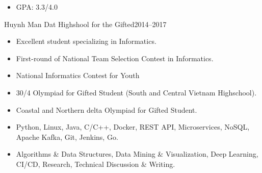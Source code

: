 
\begin{itemize}
	\item GPA: 3.3/4.0
\end{itemize}
\smallskip

{Huynh Man Dat Highshool for the Gifted}{2014--2017}{}
\begin{itemize}
	\item Excellent student specializing in Informatics.
\end{itemize}


\begin{itemize}
	\item	{First-round of National Team Selection Contest in Informatics.} 
\end{itemize}


\begin{itemize}
	\item	{National Informatics Contest for Youth} 
\end{itemize}


\begin{itemize}
	\item{30/4 Olympiad for Gifted Student (South and Central Vietnam Highschool)}. 
\end{itemize}

\begin{itemize}
	\item{Coastal and Northern delta Olympiad for Gifted Student}. 
\end{itemize}


\begin{itemize}
	\item{Python, Linux, Java, C/C++, Docker, REST API, Microservices, NoSQL, Apache Kafka, Git, Jenkins, Go.}
	\item Algorithms \& Data Structures, Data Mining \& Visualization, Deep Learning, CI/CD, Research, Technical Discussion \& Writing.
\end{itemize}




